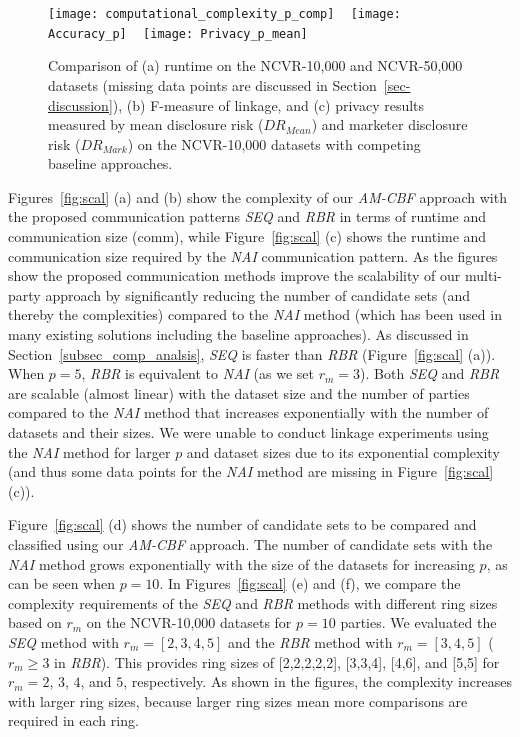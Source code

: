 \documentclass{sig-alternate}
\begin{document}
\begin{figure*}[!th]
  \centering
 \texttt{[image: computational\_complexity\_p\_comp]}
~
 \texttt{[image: Accuracy\_p]}
~
 \texttt{[image: Privacy\_p\_mean]}
 
  \caption{\small{Comparison of
  (a) runtime on the NCVR-10,000 and NCVR-50,000 datasets (missing data points are discussed in Section~\ref{sec-discussion}), 
  (b) F-measure of linkage, and (c) privacy results measured by mean disclosure risk ($DR_{Mean}$) and 
  marketer disclosure risk ($DR_{Mark}$) on the NCVR-10,000 datasets with competing baseline approaches.}
    }
\label{fig:comp}
\end{figure*}

Figures~\ref{fig:scal} (a) and (b)
show the complexity of our \emph{AM-CBF} approach
with the proposed communication patterns \emph{SEQ} and \emph{RBR}
in terms of runtime and communication size (comm), while
Figure~\ref{fig:scal} (c) shows the runtime and communication size
required by the \emph{NAI} communication pattern.
As the figures show the proposed communication methods improve the scalability
of our multi-party approach
by significantly reducing the number of candidate sets 
(and thereby the complexities)
compared to the \emph{NAI} method 
(which has been used in many existing solutions including
the baseline approaches).
As discussed in Section~\ref{subsec_comp_analsis},
\emph{SEQ} is faster than \emph{RBR} (Figure~\ref{fig:scal} (a)).
When $p=5$, \emph{RBR} is equivalent to \emph{NAI} (as we set $r_m=3$).
Both \emph{SEQ} and \emph{RBR}
are scalable (almost linear) with the
dataset size and the number of parties compared to the \emph{NAI}
method that increases
exponentially with the number of datasets and their sizes.
We were unable to conduct linkage experiments using the \emph{NAI} method for
larger $p$ and dataset sizes due to its exponential complexity
(and thus some data points for the \emph{NAI} method are missing
in Figure~\ref{fig:scal} (c)).

Figure~\ref{fig:scal} (d) shows the number of candidate
sets to be compared and classified using our \emph{AM-CBF} approach.
The number of candidate sets
with the \emph{NAI} method grows
exponentially with the size of the datasets for increasing $p$, as can be
seen when $p=10$.
In Figures~\ref{fig:scal} (e) and (f), we compare the 
complexity requirements of the \emph{SEQ} and \emph{RBR}
methods with different ring sizes based on $r_m$
on the NCVR-10,000 datasets for $p=10$ parties.
We evaluated the \emph{SEQ} method with
$r_m = [2,3,4,5]$ and the \emph{RBR} method
with $r_m=[3,4,5]$ ($r_m \ge 3$
in \emph{RBR}). 
This provides ring sizes of [2,2,2,2,2], [3,3,4], [4,6], and [5,5]
for $r_m=2$, $3$, $4$, and $5$, respectively.
As shown in the figures,
the complexity increases with larger ring sizes,
because larger ring sizes mean more comparisons are required
in each ring. 
\end{document}
